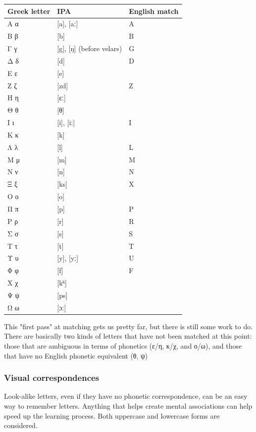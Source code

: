 \documentclass[11pt]{article}
\begin{document}
\begin{center}
\begin{tabular}{lll}
Greek letter & IPA & English match\\
\hline
Α α & [a], [aː] & A\\
Β β & [b] & B\\
Γ γ & [g], [ŋ] (before velars) & G\\
Δ δ & [d] & D\\
Ε ε & [e] & \\
Ζ ζ & [zd] & Z\\
Η η & [ɛː] & \\
Θ θ & [θ] & \\
Ι ι & [i], [iː] & I\\
Κ κ & [k] & \\
Λ λ & [l] & L\\
Μ μ & [m] & M\\
Ν ν & [n] & N\\
Ξ ξ & [ks] & X\\
Ο ο & [o] & \\
Π π & [p] & P\\
Ρ ρ & [r] & R\\
Σ σ & [s] & S\\
Τ τ & [t] & T\\
Υ υ & [y], [yː] & U\\
Φ φ & [f] & F\\
Χ χ & [kʰ] & \\
Ψ ψ & [ps] & \\
Ω ω & [ɔː] & \\
\end{tabular}
\end{center}

This "first pass" at matching gets us pretty far, but there is still some work to do. There are basically two kinds of letters that have not been matched at this point: those that are ambiguous in terms of phonetics (ε/η, κ/χ, and ο/ω), and those that have no English phonetic equivalent (θ, ψ)

\subsubsection{Visual correspondences}
\label{sec:org62e026e}

Look-alike letters, even if they have no phonetic correspondence, can be an easy way to remember letters. Anything that helps create mental associations can help speed up the learning process. Both uppercase and lowercase forms are considered.
\end{document}
